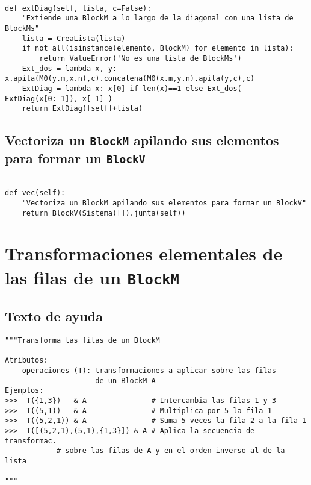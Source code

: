 \documentclass[11pt]{report}
\begin{document}
\begin{verbatim}
   
def extDiag(self, lista, c=False):
    "Extiende una BlockM a lo largo de la diagonal con una lista de BlockMs"
    lista = CreaLista(lista)
    if not all(isinstance(elemento, BlockM) for elemento in lista): 
        return ValueError('No es una lista de BlockMs')
    Ext_dos = lambda x, y: x.apila(M0(y.m,x.n),c).concatena(M0(x.m,y.n).apila(y,c),c)
    ExtDiag = lambda x: x[0] if len(x)==1 else Ext_dos( ExtDiag(x[0:-1]), x[-1] )
    return ExtDiag([self]+lista)

\end{verbatim}

\subsection{Vectoriza un \texttt{BlockM} apilando sus elementos para formar un \texttt{BlockV}}
\label{sec:orgde6a8ae}
\begin{verbatim}
   
def vec(self):
    "Vectoriza un BlockM apilando sus elementos para formar un BlockV"
    return BlockV(Sistema([]).junta(self))

\end{verbatim}

\section{Transformaciones elementales de las filas de un \texttt{BlockM}}
\label{sec:orgd1c095e}

\subsection{Texto de ayuda}
\label{sec:org8d05c36}

\begin{verbatim}
"""Transforma las filas de un BlockM

Atributos:
    operaciones (T): transformaciones a aplicar sobre las filas
                     de un BlockM A
Ejemplos:
>>>  T({1,3})   & A               # Intercambia las filas 1 y 3
>>>  T((5,1))   & A               # Multiplica por 5 la fila 1
>>>  T((5,2,1)) & A               # Suma 5 veces la fila 2 a la fila 1
>>>  T([(5,2,1),(5,1),{1,3}]) & A # Aplica la secuencia de transformac.
            # sobre las filas de A y en el orden inverso al de la lista

"""
\end{verbatim}
\end{document}
